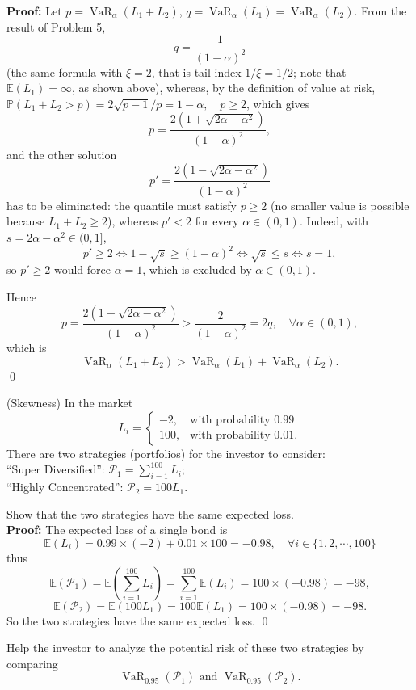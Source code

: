 \documentclass{MFM-hw} %
\newcommand{\VaR}{\operatorname{VaR}}
\newcommand{\E}{\mathbb{E}}
\renewcommand{\P}{\mathbb{P}}
\begin{document}
\textbf{Proof: }Let $p = \VaR_{\alpha}(L_1+L_2)$, $q = \VaR_{\alpha}(L_1) = \VaR_{\alpha}(L_2)$. From the result of Problem 5,
\[
    q = \frac{1}{(1-\alpha)^2}
\]
(the same formula with $\xi = 2$, that is tail index $1/\xi = 1/2$; note that $\E(L_1) = \infty$, as shown above),
whereas, by the definition of value at risk, $\P(L_1+L_2 > p) = 2\sqrt{p-1}/p = 1- \alpha, \quad p \ge 2$, which gives
\[
    p = \frac{2(1+\sqrt{2\alpha-\alpha^2})}{(1-\alpha)^2},
\]
and the other solution
\[
    p' = \frac{2(1-\sqrt{2\alpha-\alpha^2})}{(1-\alpha)^2}
\]
has to be eliminated: the quantile must satisfy $p \ge 2$ (no smaller value is possible because $L_1+L_2 \ge 2$), whereas $p' < 2$ for every $\alpha \in (0,1)$. Indeed, with $s = 2\alpha-\alpha^2 \in (0,1]$,
\[
    p' \ge 2 \iff 1-\sqrt{s} \ge (1-\alpha)^2 \iff \sqrt{s} \le s \iff s = 1,
\]
so $p' \ge 2$ would force $\alpha = 1$, which is excluded by $\alpha \in (0,1)$.

Hence
\[
    p = \frac{2(1+\sqrt{2\alpha-\alpha^2})}{(1-\alpha)^2} > \frac{2}{(1-\alpha)^2} = 2q, \quad \forall \alpha \in (0,1),
\]
which is
\[
    \VaR_{\alpha} (L_1+L_2) > \VaR_{\alpha}(L_1) + \VaR_{\alpha}(L_2).
\]\qed

\HWproblem
(Skewness) In the market
\[
    L_i = 
    \begin{cases}
        -2, &\text{with probability 0.99}\\
        100, &\text{with probability 0.01}.
    \end{cases}
\]
There are two strategies (portfolios) for the investor to consider:\\
``Super Diversified'': $\mathcal{P}_1 = \sum_{i=1}^{100} L_i$;\\
``Highly Concentrated'': $\mathcal{P}_2 = 100L_1$.

\HWsubproblem
Show that the two strategies have the same expected loss.\\

\textbf{Proof: }The expected loss of a single bond is
\[
    \E(L_i) = 0.99 \times (-2) + 0.01 \times 100 = -0.98,\quad \forall i \in \{1,2,\cdots, 100\}
\]
thus
\[
    \E(\mathcal{P}_1) = \E(\sum\limits_{i=1}^{100} L_i) = \sum\limits_{i=1}^{100} \E(L_i) = 100 \times (-0.98) = -98,
\]
\[
    \E(\mathcal{P}_2) = \E(100L_1) = 100\E(L_1) = 100 \times (-0.98) = -98.
\]
So the two strategies have the same expected loss. \qed

\HWsubproblem
Help the investor to analyze the potential risk of these two strategies by comparing
\[
    \VaR_{0.95}(\mathcal{P}_1) \text{  and  }\VaR_{0.95}(\mathcal{P}_2).
\]\\
\end{document}
